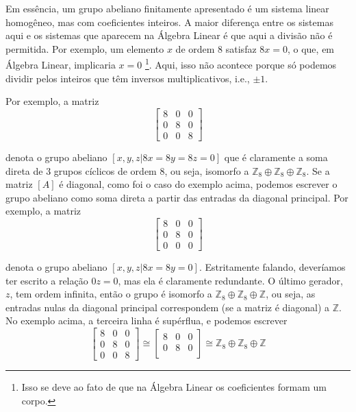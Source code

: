     	\par\vspace{0.3cm} Em essência, um grupo abeliano finitamente apresentado é um sistema linear 
    	homogêneo, mas com coeficientes inteiros. A maior diferença entre os sistemas aqui e os sistemas 
    	que aparecem na Álgebra Linear é que aqui a divisão não é permitida. Por exemplo, um elemento $x$ 
    	de ordem $8$ satisfaz $8x=0$, o que, em Álgebra Linear, implicaria $x=0$
    	\footnote{Isso se deve ao fato de que na Álgebra Linear os coeficientes formam um corpo.}. 
    	Aqui, isso não acontece porque só podemos dividir pelos inteiros que têm inversos multiplicativos, 
    	i.e., $\pm 1$.
    	
    	\par\vspace{0.3cm} Por exemplo, a matriz 
    	$$ \begin{bmatrix}
    	8 & 0 & 0 \\
    	0 & 8 & 0 \\
    	0 & 0 & 8 
    	\end{bmatrix} $$
    	\par\vspace{0.3cm} denota o grupo abeliano $[x,y,z\vert 8x=8y=8z=0]$ que é claramente a soma direta 
    	de $3$ grupos cíclicos de ordem $8$, ou seja, isomorfo a
    	$\mathbb{Z}_8\oplus\mathbb{Z}_8\oplus\mathbb{Z}_8$. Se a matriz $[A]$ é diagonal, como foi o caso 
    	do exemplo acima, podemos escrever o grupo abeliano como soma direta a partir das entradas da diagonal
    	principal. Por exemplo, a matriz
    	$$ \begin{bmatrix}
    	8 & 0 & 0 \\
    	0 & 8 & 0 \\
    	0 & 0 & 0 
    	\end{bmatrix} $$
    	\par\vspace{0.3cm} denota o grupo abeliano $[x,y,z \vert 8x=8y=0]$. Estritamente falando, deveríamos 
    	ter escrito a relação $0z=0$, mas ela é claramente redundante. O último gerador, $z$, tem ordem infinita,
    	então o grupo é isomorfo a $\mathbb{Z}_8\oplus\mathbb{Z}_8\oplus\mathbb{Z}$, ou seja, as entradas 
    	nulas da diagonal principal correspondem (se a matriz é diagonal) a $\mathbb{Z}$. No exemplo acima, 
    	a terceira linha é supérflua, e podemos escrever
    	$$ \begin{bmatrix}
    	8 & 0 & 0 \\
    	0 & 8 & 0 \\
    	0 & 0 & 8 
    	\end{bmatrix}\cong \begin{bmatrix}
    	8 & 0 & 0 \\
    	0 & 8 & 0 \\ 
    	\end{bmatrix} \cong \mathbb{Z}_8\oplus\mathbb{Z}_8\oplus\mathbb{Z} $$
    	
